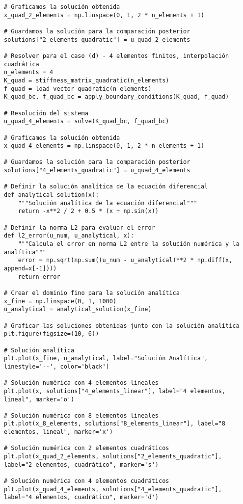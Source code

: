 \begin{verbatim}
# Graficamos la solución obtenida
x_quad_2_elements = np.linspace(0, 1, 2 * n_elements + 1)

# Guardamos la solución para la comparación posterior
solutions["2_elements_quadratic"] = u_quad_2_elements

# Resolver para el caso (d) - 4 elementos finitos, interpolación cuadrática
n_elements = 4
K_quad = stiffness_matrix_quadratic(n_elements)
f_quad = load_vector_quadratic(n_elements)
K_quad_bc, f_quad_bc = apply_boundary_conditions(K_quad, f_quad)

# Resolución del sistema
u_quad_4_elements = solve(K_quad_bc, f_quad_bc)

# Graficamos la solución obtenida
x_quad_4_elements = np.linspace(0, 1, 2 * n_elements + 1)

# Guardamos la solución para la comparación posterior
solutions["4_elements_quadratic"] = u_quad_4_elements

# Definir la solución analítica de la ecuación diferencial
def analytical_solution(x):
    """Solución analítica de la ecuación diferencial"""
    return -x**2 / 2 + 0.5 * (x + np.sin(x)) 

# Definir la norma L2 para evaluar el error
def l2_error(u_num, u_analytical, x):
    """Calcula el error en norma L2 entre la solución numérica y la analítica"""
    error = np.sqrt(np.sum((u_num - u_analytical)**2 * np.diff(x, append=x[-1])))
    return error

# Crear el dominio fino para la solución analítica
x_fine = np.linspace(0, 1, 1000)
u_analytical = analytical_solution(x_fine)

# Graficar las soluciones obtenidas junto con la solución analítica
plt.figure(figsize=(10, 6))

# Solución analítica
plt.plot(x_fine, u_analytical, label="Solución Analítica", linestyle='--', color='black')

# Solución numérica con 4 elementos lineales
plt.plot(x, solutions["4_elements_linear"], label="4 elementos, lineal", marker='o')

# Solución numérica con 8 elementos lineales
plt.plot(x_8_elements, solutions["8_elements_linear"], label="8 elementos, lineal", marker='x')

# Solución numérica con 2 elementos cuadráticos
plt.plot(x_quad_2_elements, solutions["2_elements_quadratic"], label="2 elementos, cuadrático", marker='s')

# Solución numérica con 4 elementos cuadráticos
plt.plot(x_quad_4_elements, solutions["4_elements_quadratic"], label="4 elementos, cuadrático", marker='d')


\end{verbatim}
